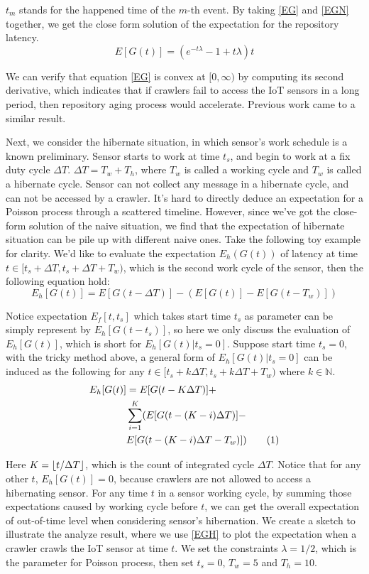 \documentclass[conference]{IEEEtran}
\newcommand\numberthis{\addtocounter{equation}{1}\tag{\theequation}}
\DeclarePairedDelimiter\floor{\lfloor}{\rfloor}
\begin{document}
\(t_{m}\) stands for the happened time of the \(m\)-th event. By taking \eqref{EG} and \eqref{EGN} together, we get the close form solution of the expectation for the repository latency.
\begin{equation}
E[G(t)] = (e^{-t\lambda}-1+t \lambda)t
\end{equation}

We can verify that equation \eqref{EG} is convex at \([0,\infty)\) by computing its second derivative, which indicates that if crawlers fail to access the IoT sensors in a long period, then repository aging process would accelerate. Previous work\cite{Cho2000} came to a similar result.


Next, we consider the hibernate situation, in which sensor's work schedule is a known preliminary. Sensor starts to work at time $t_s$, and begin to work at a fix duty cycle \(\Delta T\). \(\Delta T = T_w+T_h\), where \(T_w\) is called a working cycle and \(T_w\) is called a hibernate cycle. Sensor can not collect any message in a hibernate cycle, and can not be accessed by a crawler. It's hard to directly deduce an expectation for a Poisson process through a scattered timeline. 
However, since we've got the close-form solution of the naive situation, we find that the expectation of hibernate situation can be pile up with different naive ones. Take the following toy example for clarity.
We'd like to evaluate the expectation \(E_h(G(t))\) of latency at time \(t \in [t_s+\Delta T, t_s+\Delta T+T_w)\), which is the second work cycle of the sensor, then the following equation hold:
\[
E_h[G(t)] = E[G(t-\Delta T)] - (E[G(t)]-E[G(t-T_w)])
\]

Notice expectation $E_f[t, t_s]$ which takes start time $t_s$ as parameter can be simply represent by $E_h[G(t-t_s)]$, so here we only discuss the evaluation of $E_h[G(t)]$, which is short for $E_h[G(t)|t_s=0]$. Suppose start time $t_s=0$, with the tricky method above, a general form of \(E_h[G(t)|t_s=0]\) can be induced as the following for any \(t \in [t_s+k \Delta T, t_s+k\Delta T+T_w)\) where \(k\in\mathbb{N}\).
\begin{align*}
E_h[G(t)] &= E[G(t-K \Delta T)] + 
    \\&\sum_{i=1}^{K}(E[G(t-(K-i)\Delta T)]-
    \\&E[G(t-(K-i)\Delta T-T_w)]) \numberthis \label{EGH}
\end{align*}

Here \(K=\floor*{t/\Delta T}\), which is the count of integrated cycle \(\Delta T\). Notice that for any other \(t\), \(E_h[G(t)]=0\), because crawlers are not allowed to access a hibernating sensor. For any time \(t\) in a sensor working cycle, by summing those expectations caused by working cycle before \(t\), we can get the overall expectation of out-of-time level when considering sensor's hibernation. 
We create a sketch to illustrate the analyze result, where we use \eqref{EGH} to plot the expectation when a crawler crawls the IoT sensor at time \(t\). We set the constraints \(\lambda=1/2\), which is the parameter for Poisson process, then set \(t_s=0\), \(T_w=5\) and \(T_h=10\).
\end{document}
